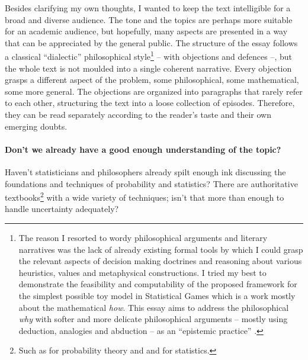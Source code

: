\documentclass{article}
\begin{document}
Besides clarifying my own thoughts, I wanted to keep the text intelligible for a broad and diverse audience. The tone and the topics are perhaps more suitable for an academic audience, but hopefully, many aspects are presented in a way that can be appreciated by the general public.
The structure of the essay follows a classical ``dialectic'' philosophical style\footnote{The reason I resorted to wordy philosophical arguments and literary narratives was the lack of already existing formal tools by which I could grasp the relevant aspects of decision making doctrines and reasoning about various heuristics, values and metaphysical constructions. I tried my best to demonstrate the feasibility and computability of the proposed framework for the simplest possible toy model in Statistical Games \cite{arxiv:StatisticalGamesKonczer2024} which is a work mostly about the mathematical \emph{how}. This essay aims to address the philosophical \emph{why} with softer and more delicate philosophical arguments -- mostly using deduction, analogies and abduction -- as an ``epistemic practice'' \cite{sep:Arguments}.} -- with objections and defences --, but the whole text is not moulded into a single coherent narrative. Every objection grasps a different aspect of the problem, some philosophical, some mathematical, some more general. The objections are organized into paragraphs that rarely refer to each other, structuring the text into a loose collection of episodes. Therefore, they can be read separately according to the reader's taste and their own emerging doubts.

\paragraph{Don't we already have a good enough understanding of the topic?}
Haven't statisticians and philosophers already spilt enough ink discussing the foundations and techniques of probability and statistics?
There are authoritative textbooks\footnote{Such as \cite{book:FellerIntroductionToProbabilityV1,book:FellerIntroductionToProbabilityV2,book:Renyi1970,book:Klenke,book:FoundationsOfModernProbability} for probability theory and \cite{book:StatisticalInference,book:CoxStatistics,book:DeGrootProbabilityAndStatistics} and \cite{book:Jaynes,book:Bernardo,book:BoxBayesianInference,book:BayesianDataAnalysis} for statistics.} with a wide variety of techniques; isn't that more than enough to handle uncertainty adequately?
\end{document}
